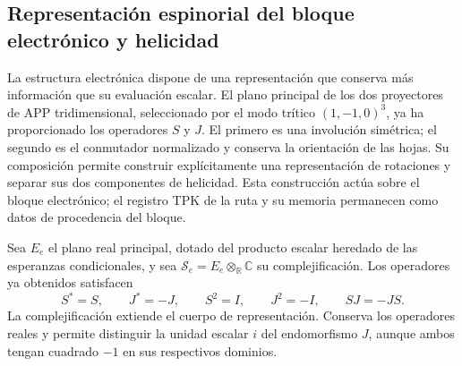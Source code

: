 \subsection{Representación espinorial del bloque electrónico y helicidad}
\label{sec:el-representacion-espinorial}

La estructura electrónica dispone de una representación que conserva más
información que su evaluación escalar. El plano principal de los dos
proyectores de APP tridimensional, seleccionado por el modo trítico
\((1,-1,0)^3\), ya ha proporcionado los operadores \(S\) y \(J\).
El primero es una involución simétrica; el segundo es el conmutador
normalizado y conserva la orientación de las hojas. Su composición permite
construir explícitamente una representación de rotaciones y separar sus
dos componentes de helicidad. Esta construcción actúa sobre el bloque
electrónico; el registro TPK de la ruta y su memoria permanecen como datos
de procedencia del bloque.

Sea \(E_e\) el plano real principal, dotado del producto escalar heredado
de las esperanzas condicionales, y sea
\(\mathscr S_e=E_e\otimes_{\mathbb R}\mathbb C\) su complejificación.
Los operadores ya obtenidos satisfacen
\[
 S^*=S,\qquad J^*=-J,\qquad
 S^2=I,\qquad J^2=-I,\qquad SJ=-JS.
\]
La complejificación extiende el cuerpo de representación. Conserva los
operadores reales y permite distinguir la unidad escalar \(i\) del
endomorfismo \(J\), aunque ambos tengan cuadrado \(-1\) en sus
respectivos dominios.


